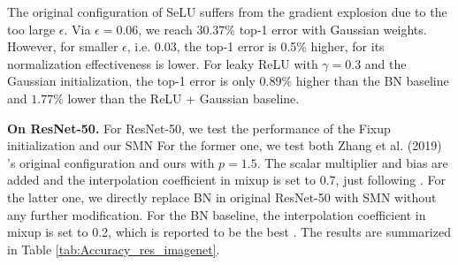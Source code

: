 \documentclass[10pt,journal,compsoc]{IEEEtran}
\begin{document}
\begin{table}[ht]
\vspace{-10pt}
\caption{Test error of methods on Conv MobileNet V1 (Cl=$95\%$).}
\centering
{}
\label{tab:Accuracy_serial_imagenet}
\end{table}

The original configuration of SeLU \cite{klambauer2017self} suffers from the gradient explosion due to the too large $\epsilon$. Via $\epsilon=0.06$, we reach $30.37\%$ top-1 error with Gaussian weights. However, for smaller $\epsilon$, i.e. $0.03$, the top-1 error is 0.5\% higher, for its normalization effectiveness is lower. For leaky ReLU with $\gamma=0.3$ and the Gaussian initialization, the top-1 error is only $0.89\%$ higher than the BN baseline and $1.77\%$ lower than the ReLU + Gaussian baseline.

\textbf{On ResNet-50.} For ResNet-50, we test the performance of the Fixup initialization and our SMN For the former one, we test both Zhang et al. (2019) \cite{zhang2019fixup}'s original configuration and ours with $p=1.5$. The scalar multiplier and bias are added and the interpolation coefficient in mixup is set to 0.7, just following \cite{zhang2019fixup}. For the latter one, we directly replace BN in original ResNet-50 with SMN without any further modification. For the BN baseline, the interpolation coefficient in mixup is set to 0.2, which is reported to be the best \cite{zhang2019fixup}. The results are summarized in Table \ref{tab:Accuracy_res_imagenet}.
\end{document}
